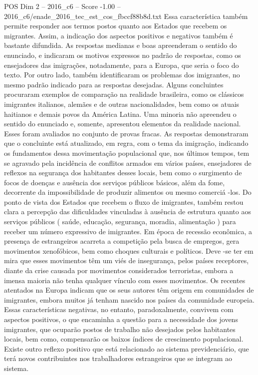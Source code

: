 \begin{textsample}{POS Dim 2 – 2016\_c6 – Score -1.00 – 2016\_c6/enade\_2016\_tec\_est\_cos\_fbccf88b8d.txt}
Essa característica também permite responder aos termos postos quanto aos Estados que recebem os migrantes.
Assim, a indicação dos aspectos positivos e negativos também é bastante difundida.
As respostas medianas e boas apreenderam o sentido do enunciado, e indicaram os motivos expressos no padrão de respostas, como os ensejadores das imigrações, notadamente, para a Europa, que seria o foco do texto.
Por outro lado, também identificaram os problemas dos imigrantes, no mesmo padrão indicado para as respostas desejadas.
Alguns concluintes procuraram exemplos de comparação na realidade brasileira, como os clássicos imigrantes italianos, alemães e de outras nacionalidades, bem como os atuais haitianos e demais povos da América Latina.
Uma minoria não apreendeu o sentido do enunciado e, somente, apresentou elementos da realidade nacional.
Esses foram avaliados no conjunto de provas fracas.
As respostas demonstraram que o concluinte está atualizado, em regra, com o tema da imigração, indicando os fundamentos dessa movimentação populacional que, nos últimos tempos, tem se agravado pela incidência de conflitos armados em vários países, ensejadores de reflexos na segurança dos habitantes desses locais, bem como o surgimento de focos de doenças e ausência dos serviços públicos básicos, além da fome, decorrente da impossibilidade de produzir alimentos ou mesmo comerciá -los.
Do ponto de vista dos Estados que recebem o fluxo de imigrantes, também restou clara a percepção das dificuldades vinculadas à ausência de estrutura quanto aos serviços públicos ( saúde, educação, segurança, moradia, alimentação ) para receber um número expressivo de imigrantes.
Em época de recessão econômica, a presença de estrangeiros acarreta a competição pela busca de empregos, gera movimentos xenofóbicos, bem como choques culturais e políticos.
Deve -se ter em mira que esses movimentos têm um viés de insegurança, pelos países receptores, diante da crise causada por movimentos considerados terroristas, embora a imensa maioria não tenha qualquer vínculo com esses movimentos.
Os recentes atentados na Europa indicam que os seus autores têm origem em comunidades de imigrantes, embora muitos já tenham nascido nos países da comunidade europeia.
Essas características negativas, no entanto, paradoxalmente, convivem com aspectos positivos, o que encaminha a questão para a necessidade dos jovens imigrantes, que ocuparão postos de trabalho não desejados pelos habitantes locais, bem como, compensarão os baixos índices de crescimento populacional.
Existe outro reflexo positivo que está relacionado ao sistema previdenciário, que terá novos contribuintes nos trabalhadores estrangeiros que se integram ao sistema.

\end{textsample}

